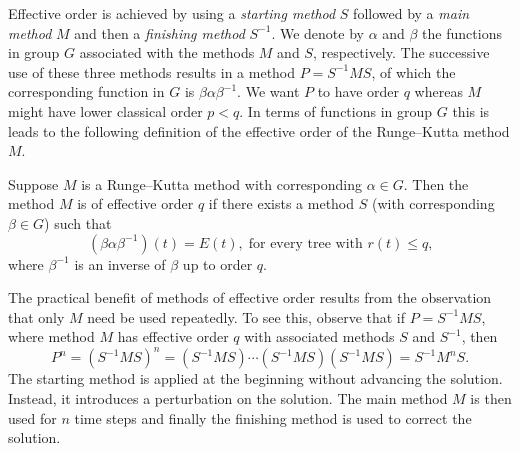 Effective order is achieved by using a \emph{starting method} $S$
followed by a \emph{main method} $M$
and then a \emph{finishing method} $S^{-1}$.
We denote by $\alpha$ and $\beta$ the functions in group $G$ associated with the methods $M$ and $S$, respectively.
The successive use of these three methods results in a method $P = S^{-1}MS$, of which the corresponding function in $G$ is $\beta\alpha\beta^{-1}$.
We want $P$ to have order $q$ whereas $M$ might have lower classical
order $p < q$.
In terms of functions in group $G$ this is leads to the following definition of the effective order of the Runge--Kutta method $M$.
\begin{definition}\cite{Butcher1987_book}\label{def:Effective_order}
  Suppose $M$ is a Runge--Kutta method with corresponding $\alpha \in G$.
  Then the method $M$ is of effective order $q$ if there exists a method
  $S$ (with corresponding $\beta \in G$) such that
	\begin{equation}\label{eq:Effective_order_1}
		(\beta\alpha\beta^{-1})(t) = E(t), \; \text{for every tree with $r(t) \leq q$,}
	\end{equation}
        where $\beta^{-1}$ is an inverse of $\beta$ up to order $q$.
\end{definition}
The practical benefit of methods of effective order results from the
observation that only $M$ need be used repeatedly.
To see this, observe that if $P=S^{-1}MS$, where method
$M$ has effective order $q$ with associated methods $S$ and $S^{-1}$, then
\begin{displaymath}
	P^n = (S^{-1}MS)^n = (S^{-1}MS) \cdots (S^{-1}MS) (S^{-1}MS) = S^{-1} M^n S.
\end{displaymath}
The starting method is applied at the beginning without advancing the
solution.
Instead, it introduces a perturbation on the solution.
The main method \( M \) is then used for \( n \) time steps and finally the
finishing method is used to correct the solution.




